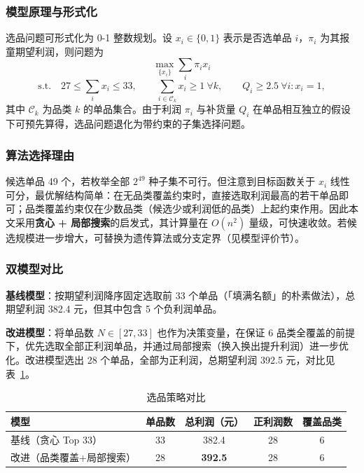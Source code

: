 \documentclass[12pt]{ctexart}
\begin{document}
\subsubsection{模型原理与形式化}
选品问题可形式化为 0-1 整数规划。设 $x_i\in\{0,1\}$ 表示是否选单品 $i$，$\pi_i$ 为其报童期望利润，则问题为
\begin{equation}
\max_{\{x_i\}} \sum_{i} \pi_i x_i
\end{equation}
\begin{equation}
\text{s.t.}\quad 27 \le \sum_i x_i \le 33,\qquad
\sum_{i\in\mathcal{C}_k} x_i \ge 1\ \forall k,\qquad
Q_i \ge 2.5\ \forall i:x_i=1,
\end{equation}
其中 $\mathcal{C}_k$ 为品类 $k$ 的单品集合。由于利润 $\pi_i$ 与补货量 $Q_i$ 在单品相互独立的假设下可预先算得，选品问题退化为带约束的子集选择问题。

\subsubsection{算法选择理由}
候选单品 49 个，若枚举全部 $2^{49}$ 种子集不可行。但注意到目标函数关于 $x_i$ 线性可分，最优解结构简单：在无品类覆盖约束时，直接选取利润最高的若干单品即可；品类覆盖约束仅在少数品类（候选少或利润低的品类）上起约束作用。因此本文采用\textbf{贪心 + 局部搜索}的启发式，其计算量在 $O(n^2)$ 量级，可快速收敛。若候选规模进一步增大，可替换为遗传算法或分支定界（见模型评价节）。

\subsubsection{双模型对比}
\textbf{基线模型}：按期望利润降序固定选取前 33 个单品（「填满名额」的朴素做法），总期望利润 382.4 元，但其中包含 5 个负利润单品。

\textbf{改进模型}：将单品数 $N\in[27,33]$ 也作为决策变量，在保证 6 品类全覆盖的前提下，优先选取全部正利润单品，并通过局部搜索（换入换出提升利润）进一步优化。改进模型选出 28 个单品，全部为正利润，总期望利润 392.5 元，对比见表~\ref{tab:select}。

\begin{table}[htbp]
\centering
\caption{选品策略对比}
\label{tab:select}
\begin{tabular}{lcccc}
\toprule
模型 & 单品数 & 总利润（元） & 正利润数 & 覆盖品类 \\
\midrule
基线（贪心 Top 33） & 33 & 382.4 & 28 & 6 \\
改进（品类覆盖+局部搜索） & 28 & \textbf{392.5} & 28 & 6 \\
\bottomrule
\end{tabular}
\end{table}
\end{document}
